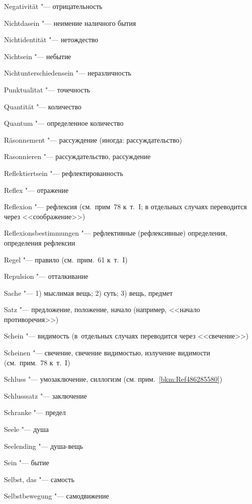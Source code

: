 \begin{multicols}{2}
Nega\-tivi\-tät "--- отрицательность

Nicht\-da\-sein "--- неимение наличного бытия

Nicht\-iden\-tität "--- нетождество

Nicht\-sein "--- небытие

Nicht\-unter\-schieden\-sein "--- неразличность

\bigskip

Punktu\-ali\-tat "--- точечность

\bigskip

Quantität "--- количество

Quantum "--- определенное количество

\bigskip

Räson\-nement "--- рассуждение (иногда: рассуждательство)

Rason\-nieren "--- рассуждательство, рассуждение

Reflek\-tiertsein "--- рефлектированность

Reflex "--- отражение

Reflexion "--- рефлексия (см.~прим~78 к~т.~I; в отдельных случаях
переводится через <<соображение>>)

Re\-flexions\-bestim\-mungen "--- рефлективные (рефлексивные)
определения, определения рефлексии

Regel "--- правило (см.~прим.~61 к~т.~I)

Repul\-sion "--- отталкивание

\bigskip

Sache "--- 1) мыслимая вещь; 2) суть; 3) вещь, предмет

Satz "--- предложение, положение, начало (например, <<начало противоречия>>)

Schein "--- видимость (в~отдельных случаях переводится через <<свечение>>)

Scheinen "--- свечение, свечение видимостью, излучение видимости
(см.~прим.~78 к~т.~I)

Schluss "--- умозаключение, силлогизм (см. прим.~\ref{bkm:Ref486285580})

Schluss\-satz "--- заключение

Schranke "--- предел

Seele "--- душа

Seelending "--- душа-вещь

Sein "--- бытие

Selbst, das "--- самость

Selbst\-bewegung "--- самодвижение


\end{multicols}
